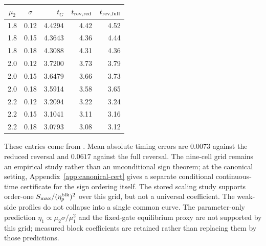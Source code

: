 \documentclass[10pt]{article}
\theoremstyle{remark}\newtheorem{remark}[theorem]{Remark}
\begin{document}
\begin{center}
\begin{tabular}{ccrrr}\toprule
$\mu_2$&$\sigma$&$t_G$&$t_{\rm rev,red}$&$t_{\rm rev,full}$\\\midrule
1.8&0.12&4.4294&4.42&4.52\\
1.8&0.15&4.3643&4.36&4.44\\
1.8&0.18&4.3088&4.31&4.36\\
2.0&0.12&3.7200&3.73&3.79\\
2.0&0.15&3.6479&3.66&3.73\\
2.0&0.18&3.5914&3.58&3.65\\
2.2&0.12&3.2094&3.22&3.24\\
2.2&0.15&3.1041&3.11&3.16\\
2.2&0.18&3.0793&3.08&3.12\\\bottomrule
\end{tabular}
\end{center}
These entries come from
.
Mean absolute timing errors are $0.0073$ against the reduced reversal and
$0.0617$ against the full reversal. The nine-cell grid remains an empirical
study rather than an unconditional sign theorem; at the canonical setting,
Appendix~\ref{app:canonical-cert} gives a separate conditional continuous-time
certificate for the sign ordering itself. The stored scaling study supports
order-one $S_{\max}/(\eta_p^{\rm blk})^2$ over this grid, but not a universal
coefficient. The weak-side profiles do not collapse into a single common
curve. The parameter-only prediction $\eta_1\propto\mu_2\sigma/\mu_1^2$
and the fixed-gate equilibrium proxy are not supported by this grid;
measured block coefficients are retained rather than replacing them by
those predictions.
\end{document}
